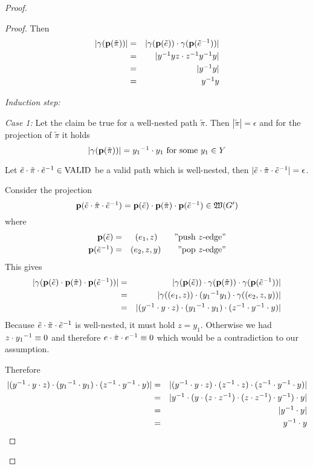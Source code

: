 \begin{proof}
\begin{proof}
Then
\begin{eqnarray*}
|\gamma(\mathbf{p}({\tilde{\pi}}))| &=& |\gamma(\mathbf{p}({\tilde e})) \cdot
\gamma(\mathbf{p}({\mbox{${\tilde e}^{-1}$}}))|
\\
&=& |\mbox{${y}^{-1}$} y z \cdot \mbox{${z}^{-1}$} \mbox{${y}^{-1}$} y| \\
&=& |\mbox{${y}^{-1}$} y| \\
&=& \mbox{${y}^{-1}$} y
\end{eqnarray*}

\medskip
{\em Induction step:}

{\em Case 1:} Let the claim be true for a well-nested path $\tilde{\pi}$. Then
$|\tilde{\pi}| = \epsilon$ and for the projection of $\tilde{\pi}$ it holds
\[ |\gamma(\mathbf{p}({\tilde{\pi}}))| = \mbox{${y_1}^{-1}$} \cdot y_1\text{ for some }y_1 \in Y
\]

Let $\tilde e \cdot \tilde{\pi} \cdot \mbox{${\tilde e}^{-1}$} \in \mathrm{VALID}$ be a valid
path which is well-nested, then $|\tilde e \cdot \tilde{\pi} \cdot \mbox{${\tilde
e}^{-1}$}| = \epsilon$.

Consider the projection
\[ \mathbf{p}({\tilde e \cdot \tilde{\pi} \cdot \mbox{${\tilde e}^{-1}$}}) = \mathbf{p}({\tilde e})
\cdot \mathbf{p}({\tilde{\pi}}) \cdot \mathbf{p}({\mbox{${\tilde e}^{-1}$}}) \in \mbox{$\mathfrak{W}({G'})$} \]
where
\begin{eqnarray*}
\mathbf{p}({\tilde e}) &=& (e_1, z) \qquad\text{''push $z$-edge''}\\
\mathbf{p}({\mbox{${\tilde e}^{-1}$}}) &=& (e_2, z, y) \qquad\text{''pop $z$-edge''}\\
\end{eqnarray*}
This gives
\begin{eqnarray*}
|\gamma(\mathbf{p}({\tilde e}) \cdot \mathbf{p}({\tilde{\pi}}) \cdot \mathbf{p}({\mbox{${\tilde
e}^{-1}$}}))|&=& |\gamma(\mathbf{p}({\tilde e})) \cdot \gamma(\mathbf{p}({\tilde{\pi}})) \cdot
\gamma(\mathbf{p}({\mbox{${\tilde e}^{-1}$}}))| \\
&=&|\gamma((e_1, z)) \cdot  (\mbox{${y_1}^{-1}$} y_1) \cdot \gamma((e_2, z, y))| \\
&=& |(\mbox{${y}^{-1}$} \cdot y \cdot z) \cdot (\mbox{${y_1}^{-1}$} \cdot y_1) \cdot (\mbox{${z}^{-1}$} \cdot
\mbox{${y}^{-1}$} \cdot y)| \\
\end{eqnarray*}
Because $\tilde e \cdot \tilde{\pi} \cdot \mbox{${\tilde e}^{-1}$}$ is well-nested, it
must hold $z = y_1$. Otherwise we had $z \cdot \mbox{${y_1}^{-1}$} \equiv 0$ and therefore
$e \cdot \tilde{\pi} \cdot \mbox{${e}^{-1}$} \equiv 0$ which would be a contradiction to 
our assumption.

Therefore
\begin{eqnarray*}
|(\mbox{${y}^{-1}$} \cdot y \cdot z) \cdot (\mbox{${y_1}^{-1}$} \cdot y_1) \cdot (\mbox{${z}^{-1}$} \cdot
\mbox{${y}^{-1}$} \cdot y)| &=&
|(\mbox{${y}^{-1}$} \cdot y \cdot z) \cdot (\mbox{${z}^{-1}$} \cdot z) \cdot (\mbox{${z}^{-1}$} \cdot
\mbox{${y}^{-1}$} \cdot y)| \\
&=& |\mbox{${y}^{-1}$} \cdot (y \cdot (z \cdot \mbox{${z}^{-1}$}) \cdot (z \cdot \mbox{${z}^{-1}$}) \cdot
\mbox{${y}^{-1}$}) \cdot y| \\
&=& |\mbox{${y}^{-1}$} \cdot y| \\
&=& \mbox{${y}^{-1}$}  \cdot y
\end{eqnarray*}


\end{proof}
\end{proof}
